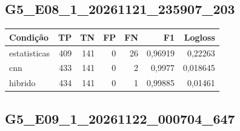 \subsection{G5\_E08\_1\_20261121\_235907\_203}
\small\begin{longtable}{@{}p{.38\linewidth}rrrrrr@{}}
\toprule Condição & TP & TN & FP & FN & F1 & Logloss\\\midrule\endhead
estatisticas & 409 & 141 & 0 & 26 & 0,96919 & 0,22263\\
cnn & 433 & 141 & 0 & 2 & 0,9977 & 0,018645\\
hibrido & 434 & 141 & 0 & 1 & 0,99885 & 0,01461\\
\bottomrule\end{longtable}\normalsize

\subsection{G5\_E09\_1\_20261122\_000704\_647}
